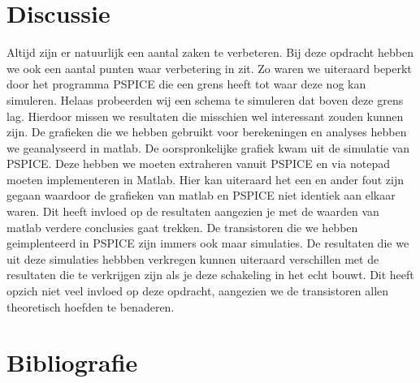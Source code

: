 \documentclass{scrartcl}  %
\begin{document}
\section{Discussie}
Altijd zijn er natuurlijk een aantal zaken te verbeteren. Bij deze opdracht hebben we ook een aantal punten waar verbetering in zit. Zo waren we uiteraard beperkt door het programma PSPICE die een grens heeft tot waar deze nog kan simuleren. Helaas probeerden wij een schema te simuleren dat boven deze grens lag. Hierdoor missen we resultaten die misschien wel interessant zouden kunnen zijn. 
De grafieken die we hebben gebruikt voor berekeningen en analyses hebben we geanalyseerd in matlab. De oorspronkelijke grafiek kwam uit de simulatie van PSPICE. Deze hebben we moeten extraheren vanuit PSPICE en via notepad moeten implementeren in Matlab. Hier kan uiteraard het een en ander fout zijn gegaan waardoor de grafieken van matlab en PSPICE niet identiek aan elkaar waren. Dit heeft invloed op de resultaten aangezien je met de waarden van matlab verdere conclusies gaat trekken. 
De transistoren die we hebben geimplenteerd in PSPICE zijn immers ook maar simulaties. De resultaten die we uit deze simulaties hebbben verkregen kunnen uiteraard verschillen met de resultaten die te verkrijgen zijn als je deze schakeling in het echt bouwt. Dit heeft opzich niet veel invloed op deze opdracht, aangezien we de transistoren allen theoretisch hoefden te benaderen. 

\newpage
{}
\section{Bibliografie}
\printbibliography
\end{document}
